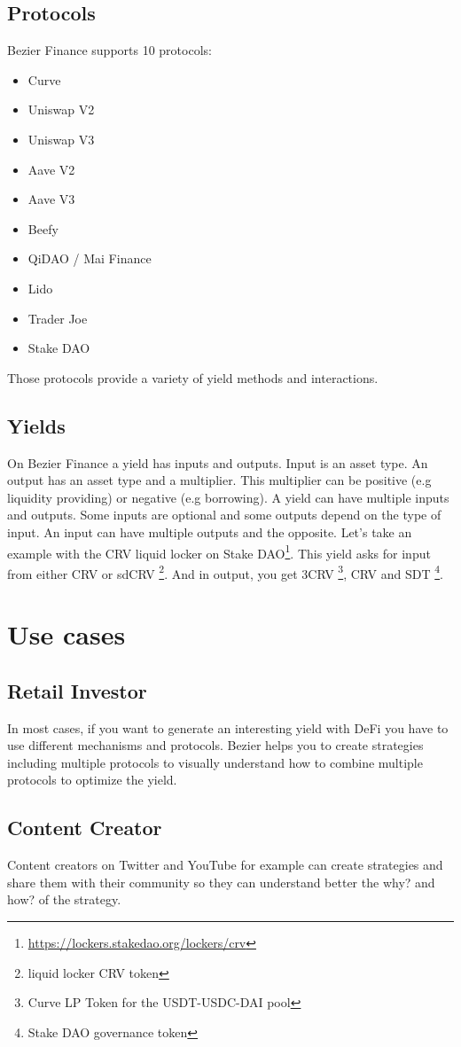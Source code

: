 \documentclass{article}
\begin{document}
\subsection{Protocols}
Bezier Finance supports 10 protocols:
\begin{itemize}
    \item Curve
    \item Uniswap V2
    \item Uniswap V3
    \item Aave V2
    \item Aave V3
    \item Beefy
    \item QiDAO / Mai Finance
    \item Lido
    \item Trader Joe
    \item Stake DAO
\end{itemize}
Those protocols provide a variety of yield methods and interactions. 
\label{sec:integration__yield}
\subsection{Yields}
On Bezier Finance a yield has inputs and outputs. Input is an asset type. An output has an asset type and a multiplier. This multiplier can be positive (e.g liquidity providing) or negative (e.g borrowing). A yield can have multiple inputs and outputs. Some inputs are optional and some outputs depend on the type of input. An input can have multiple outputs and the opposite. Let's take an example with the CRV liquid locker on Stake DAO\footnote{\url{https://lockers.stakedao.org/lockers/crv}}. This yield asks for input from either CRV or sdCRV \footnote{liquid locker CRV token}. And in output, you get 3CRV \footnote{Curve LP Token for the USDT-USDC-DAI pool}, CRV and SDT \footnote{Stake DAO governance token}.
\section{Use cases}
\subsection{Retail Investor}
In most cases, if you want to generate an interesting yield with DeFi you have to use different mechanisms and protocols. Bezier helps you to create strategies including multiple protocols to visually understand how to combine multiple protocols to optimize the yield.
\subsection{Content Creator}
Content creators on Twitter and YouTube for example can create strategies and share them with their community so they can understand better the why? and how? of the strategy.
\end{document}
